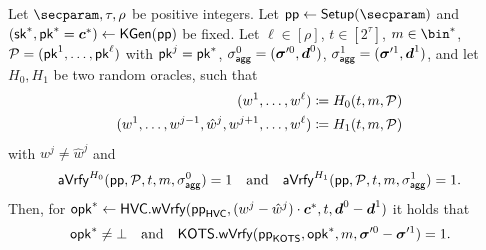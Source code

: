 \begin{lemma}\label{lem:forkingisuseful}
  Let $\secparam,\tau,\rho$ be positive integers.
  Let $\params\gets\setup(\secparam)$ and $(\mathsf{sk}^*,\mathsf{pk}^*=\boldsymbol{c}^*) \gets\mathsf{KGen}(\mathsf{pp})$ be fixed.
  Let $\ell\in[\rho]$, $t\in[2^\tau]$, $m\in\bin^*$, $\mathcal{P} = (\mathsf{pk}^1,\dots,\mathsf{pk}^{\ell})$ with $\mathsf{pk}^j=\mathsf{pk}^*$, $\sigma_\mathsf{agg}^0=(\boldsymbol{\sigma}'^0,\boldsymbol{d}^0)$, $\sigma_\mathsf{agg}^1=(\boldsymbol{\sigma}'^1,\boldsymbol{d}^1)$, and let $H_0,H_1$ be two random oracles, such that 
  \begin{align*}
    (w^1,\dots,w^{\ell}) &\coloneqq H_0(t,m,\mathcal{P})\\
    (w^1,\dots,w^{j-1},\hat{w}^j,w^{j+1},\dots,w^{\ell}) &\coloneqq H_1(t,m,\mathcal{P})
  \end{align*}
  with $w^j\neq \hat{w}^j$ and
  \[
    \mathsf{aVrfy}^{H_0}(\mathsf{pp},\mathcal{P},t,m,\sigma_\mathsf{agg}^0)=1 \quad \text{and} \quad \mathsf{aVrfy}^{H_1}(\mathsf{pp},\mathcal{P},t,m,\sigma_\mathsf{agg}^1)=1.
  \]
  Then, for $\mathsf{opk}^*\gets\mathsf{HVC}.\mathsf{wVrfy}(\mathsf{pp}_{\mathsf{HVC}},(w^j-\hat{w}^j)\cdot \boldsymbol{c}^*,t,\boldsymbol{d}^0-\boldsymbol{d}^1)$ it holds that
  \[
    \mathsf{opk}^* \neq \bot \quad \text{and} \quad \mathsf{KOTS}.\mathsf{wVrfy}(\mathsf{pp}_{\mathsf{KOTS}},\mathsf{opk}^*,m,\boldsymbol{\sigma}'^0-\boldsymbol{\sigma}'^1) = 1.
  \]
\end{lemma}

